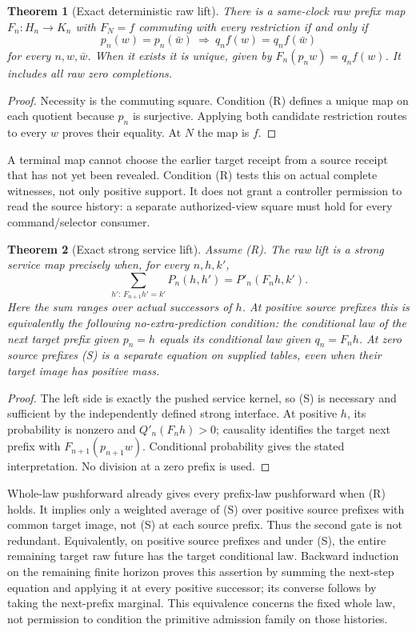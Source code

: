 \documentclass{article}
\newtheorem{theorem}{Theorem}\newtheorem{proposition}{Proposition}
\begin{document}
\begin{theorem}[Exact deterministic raw lift]
There is a same-clock raw prefix map $F_n:H_n\to K_n$ with $F_N=f$ commuting with every restriction if and only if
\[
 p_n(w)=p_n(\bar w)\ \Longrightarrow\ q_n f(w)=q_n f(\bar w) \tag{R}
\]
for every $n,w,\bar w$. When it exists it is unique, given by $F_n(p_nw)=q_nf(w)$. It includes all raw zero completions.
\end{theorem}
\begin{proof}
Necessity is the commuting square. Condition (R) defines a unique map on each quotient because $p_n$ is surjective. Applying both candidate restriction routes to every $w$ proves their equality. At $N$ the map is $f$.\end{proof}
A terminal map cannot choose the earlier target receipt from a source receipt that has not yet been revealed. Condition (R) tests this on actual complete witnesses, not only positive support. It does not grant a controller permission to read the source history: a separate authorized-view square must hold for every command/selector consumer.

\begin{theorem}[Exact strong service lift]
Assume (R). The raw lift is a strong service map precisely when, for every $n,h,k'$,
\[
 \sum_{h':\,F_{n+1}h'=k'}P_n(h,h')=P'_n(F_nh,k'). \tag{S}
\]
Here the sum ranges over actual successors of $h$. At positive source prefixes this is equivalently the following no-extra-prediction condition: the conditional law of the next target prefix given $p_n=h$ equals its conditional law given $q_n=F_nh$. At zero source prefixes (S) is a separate equation on supplied tables, even when their target image has positive mass.
\end{theorem}
\begin{proof}
The left side is exactly the pushed service kernel, so (S) is necessary and sufficient by the independently defined strong interface. At positive $h$, its probability is nonzero and $Q'_n(F_nh)>0$; causality identifies the target next prefix with $F_{n+1}(p_{n+1}w)$. Conditional probability gives the stated interpretation. No division at a zero prefix is used.\end{proof}

Whole-law pushforward already gives every prefix-law pushforward when (R) holds. It implies only a weighted average of (S) over positive source prefixes with common target image, not (S) at each source prefix. Thus the second gate is not redundant. Equivalently, on positive source prefixes and under (S), the entire remaining target raw future has the target conditional law. Backward induction on the remaining finite horizon proves this assertion by summing the next-step equation and applying it at every positive successor; its converse follows by taking the next-prefix marginal. This equivalence concerns the fixed whole law, not permission to condition the primitive admission family on those histories.
\end{document}
